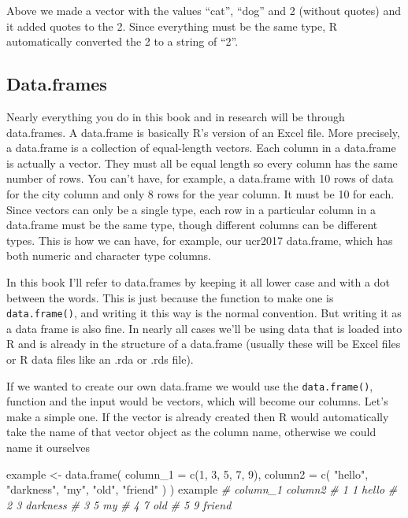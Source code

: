 \documentclass[
  a4paper,
]{krantz}
\makeatletter
\newenvironment{Shaded}{\begin{snugshade}}{\end{snugshade}}
\newcommand{\AttributeTok}[1]{\textcolor[rgb]{0.77,0.63,0.00}{#1}}
\newcommand{\CommentTok}[1]{\textcolor[rgb]{0.56,0.35,0.01}{\textit{#1}}}
\newcommand{\DecValTok}[1]{\textcolor[rgb]{0.00,0.00,0.81}{#1}}
\newcommand{\FunctionTok}[1]{\textcolor[rgb]{0.00,0.00,0.00}{#1}}
\newcommand{\NormalTok}[1]{#1}
\newcommand{\OtherTok}[1]{\textcolor[rgb]{0.56,0.35,0.01}{#1}}
\newcommand{\StringTok}[1]{\textcolor[rgb]{0.31,0.60,0.02}{#1}}
\newenvironment{kframe}{%
\medskip{}
\setlength{\fboxsep}{.8em}
 \def\at@end@of@kframe{}%
 \ifinner\ifhmode%
  \def\at@end@of@kframe{\end{minipage}}%
  \begin{minipage}{\columnwidth}%
 \fi\fi%
 \def\FrameCommand##1{\hskip\@totalleftmargin \hskip-\fboxsep
 \colorbox{shadecolor}{##1}\hskip-\fboxsep
     \hskip-\linewidth \hskip-\@totalleftmargin \hskip\columnwidth}%
 \MakeFramed {\advance\hsize-\width
   \@totalleftmargin\z@ \linewidth\hsize
   \@setminipage}}%
 {\par\unskip\endMakeFramed%
 \at@end@of@kframe}
\renewenvironment{Shaded}{\begin{kframe}}{\end{kframe}}
\makeatother
\begin{document}
Above we made a vector with the values ``cat'', ``dog'' and
2 (without quotes) and it added quotes to the 2. Since
everything must be the same type, R automatically converted
the 2 to a string of ``2''.

\hypertarget{dataframes}{%
\subsection{Data.frames}\label{dataframes}}

Nearly everything you do in this book and in research will
be through data.frames. A data.frame is basically R's
version of an Excel file. More precisely, a data.frame is a
collection of equal-length vectors. Each column in a
data.frame is actually a vector. They must all be equal
length so every column has the same number of rows. You
can't have, for example, a data.frame with 10 rows of data
for the city column and only 8 rows for the year column. It
must be 10 for each. Since vectors can only be a single
type, each row in a particular column in a data.frame must
be the same type, though different columns can be different
types. This is how we can have, for example, our ucr2017
data.frame, which has both numeric and character type
columns.

In this book I'll refer to data.frames by keeping it all
lower case and with a dot between the words. This is just
because the function to make one is \texttt{data.frame()},
and writing it this way is the normal convention. But
writing it as a data frame is also fine. In nearly all cases
we'll be using data that is loaded into R and is already in
the structure of a data.frame (usually these will be Excel
files or R data files like an .rda or .rds file).

If we wanted to create our own data.frame we would use the
\texttt{data.frame()}, function and the input would be
vectors, which will become our columns. Let's make a simple
one. If the vector is already created then R would
automatically take the name of that vector object as the
column name, otherwise we could name it ourselves

\begin{Shaded}
\begin{Highlighting}[]
\NormalTok{example }\OtherTok{\textless{}{-}} \FunctionTok{data.frame}\NormalTok{(}
  \AttributeTok{column\_1 =} \FunctionTok{c}\NormalTok{(}\DecValTok{1}\NormalTok{, }\DecValTok{3}\NormalTok{, }\DecValTok{5}\NormalTok{, }\DecValTok{7}\NormalTok{, }\DecValTok{9}\NormalTok{),}
  \AttributeTok{column2 =} \FunctionTok{c}\NormalTok{(}
    \StringTok{"hello"}\NormalTok{,}
    \StringTok{"darkness"}\NormalTok{,}
    \StringTok{"my"}\NormalTok{,}
    \StringTok{"old"}\NormalTok{,}
    \StringTok{"friend"}
\NormalTok{  )}
\NormalTok{)}
\NormalTok{example}
\CommentTok{\#   column\_1  column2}
\CommentTok{\# 1        1    hello}
\CommentTok{\# 2        3 darkness}
\CommentTok{\# 3        5       my}
\CommentTok{\# 4        7      old}
\CommentTok{\# 5        9   friend}
\end{Highlighting}
\end{Shaded}
\end{document}
